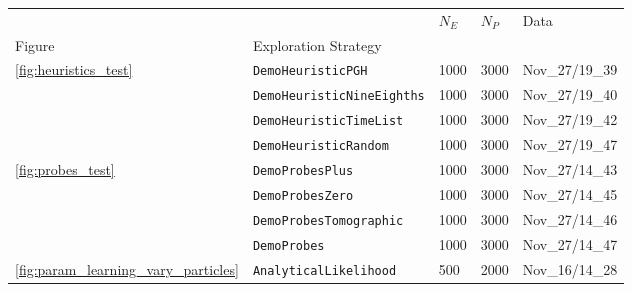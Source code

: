 \begin{tabular}{lllll}
\hline
                                 &                                   &                                    $N_E$ &                                    $N_P$ &                                     Data \\
Figure & Exploration Strategy &                                          &                                          &                                          \\
\midrule
\multirow{4}{*}{\cref{fig:heuristics_test}} & \texttt{DemoHeuristicPGH} &                                     1000 &                                     3000 &                           Nov\_27/19\_39 \\
                                 & \texttt{DemoHeuristicNineEighths} &                                     1000 &                                     3000 &                           Nov\_27/19\_40 \\
                                 & \texttt{DemoHeuristicTimeList} &                                     1000 &                                     3000 &                           Nov\_27/19\_42 \\
                                 & \texttt{DemoHeuristicRandom} &                                     1000 &                                     3000 &                           Nov\_27/19\_47 \\
\cline{1-5}
\multirow{4}{*}{\cref{fig:probes_test}} & \texttt{DemoProbesPlus} &                                     1000 &                                     3000 &                           Nov\_27/14\_43 \\
                                 & \texttt{DemoProbesZero} &                                     1000 &                                     3000 &                           Nov\_27/14\_45 \\
                                 & \texttt{DemoProbesTomographic} &                                     1000 &                                     3000 &                           Nov\_27/14\_46 \\
                                 & \texttt{DemoProbes} &                                     1000 &                                     3000 &                           Nov\_27/14\_47 \\
\cline{1-5}
\cref{fig:param_learning_vary_particles} & \texttt{AnalyticalLikelihood} &                                      500 &                                     2000 &                           Nov\_16/14\_28 \\

\end{tabular}
